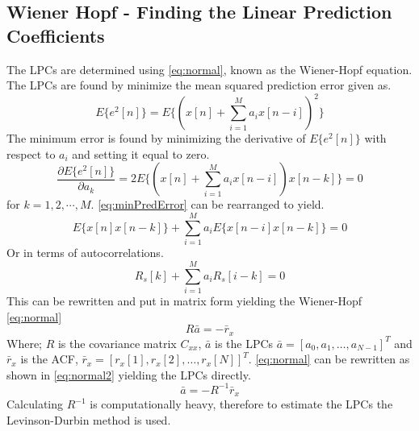 \subsection{ Wiener Hopf - Finding the Linear Prediction Coefficients}
 The LPCs are determined using \autoref{eq:normal}, known as the Wiener-Hopf equation. The LPCs are found by minimize the mean squared prediction error given as.
 \begin{equation}
 	E\{e^2[n]\}=E\{(x[n]+\sum_{i=1}^{M}a_ix[n-i] )^2\}
 \end{equation}
 The minimum error is found by minimizing the derivative of $E\{e^2[n]\}$ with respect to $a_i$ and setting it equal to zero. 
 \begin{equation}\label{eq:minPredError}
 \frac{\partial E\{e^2[n]\}}{\partial a_k} =2E\{(x[n]+\sum_{i=1}^{M}a_ix[n-i] )x[n-k]\}=0
 \end{equation}
 for $k = 1, 2, \cdots, M$. \autoref{eq:minPredError} can be rearranged to yield.
 \begin{equation}
 	E\{x[n]x[n-k]\}+\sum_{i=1}^{M}a_iE\{x[n-i]x[n-k]\}=0
 \end{equation} 
 Or in terms of autocorrelations. 
 \begin{equation}
 R_s[k]+\sum_{i=1}^{M}a_iR_s[i-k]=0
 \end{equation} 
 This can be rewritten and put in matrix form yielding the Wiener-Hopf \autoref{eq:normal}
\begin{equation}\label{eq:normal}
R  \bar{a} = -\bar{r}_x
\end{equation}
Where; $R$ is the covariance matrix $C_{xx}$, $\bar{a}$ is the LPCs $\bar{a} = [a_0 , a_1, \dots, a_{N-1}]^T$ and $\bar{r}_x$ is the ACF, $\bar{r}_x = [r_x[1] , r_x[2], \dotsc, r_x[N]]^T$. \autoref{eq:normal} can be rewritten as shown in \autoref{eq:normal2} yielding the LPCs directly.  
\begin{equation}\label{eq:normal2}
\bar{a} = -R^{-1} \bar{r}_x
\end{equation}
Calculating $R^{-1}$ is computationally heavy, therefore to estimate the LPCs the Levinson-Durbin method is used. 

